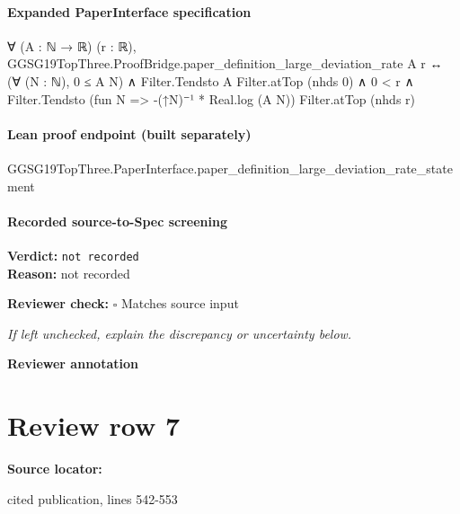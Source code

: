 \documentclass[10pt]{article}
\newcommand{\reviewerbox}{%
  \par\noindent\fbox{\parbox{0.96\linewidth}{\rule{0pt}{0.38in}}}\par
}
\newcommand{\reviewmatch}[1]{%
  \par\noindent\textbf{Reviewer check:} $\square$\; #1\par
  \noindent\emph{If left unchecked, explain the discrepancy or uncertainty below.}\par
}
\begin{document}
\paragraph{Expanded PaperInterface specification}
\begin{ReviewVerbatim}
∀ (A : ℕ → ℝ) (r : ℝ),
  GGSG19TopThree.ProofBridge.paper_definition_large_deviation_rate A r ↔
    (∀ (N : ℕ), 0 ≤ A N) ∧
      Filter.Tendsto A Filter.atTop (nhds 0) ∧
        0 < r ∧ Filter.Tendsto (fun N => -(↑N)⁻¹ * Real.log (A N)) Filter.atTop (nhds r)
\end{ReviewVerbatim}

\paragraph{Lean proof endpoint (built separately)}\begin{ReviewVerbatim}
GGSG19TopThree.PaperInterface.paper_definition_large_deviation_rate_statement
\end{ReviewVerbatim}

\paragraph{Recorded source-to-Spec screening}
\textbf{Verdict:} \texttt{not recorded}
\\
\textbf{Reason:} not recorded
\reviewmatch{Matches source input}
\noindent\textbf{Reviewer annotation}\par
\reviewerbox
\clearpage
\hypertarget{source-claim-c1b6c1660b45dd91}{}
\section*{Review row 7}
\textbf{Source locator:} {\footnotesize\raggedright cited publication, lines 542-\allowbreak{}553\par}
\end{document}
